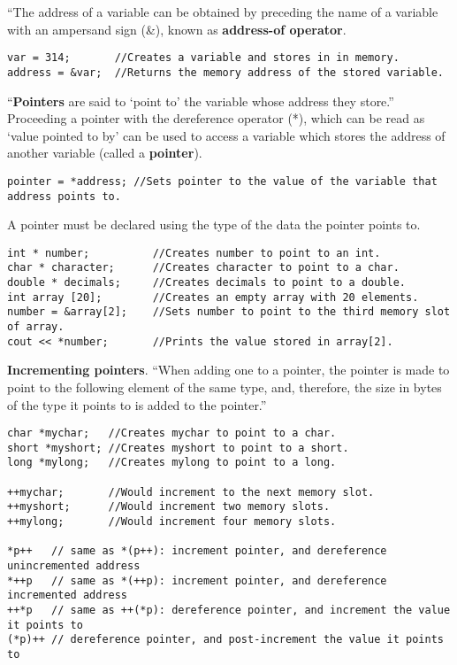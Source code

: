 ``The address of a variable can be obtained by preceding the name of a variable with an ampersand sign (\&), known as \textbf{address-of operator}. \cite{cpp:pointers}
\begin{lstlisting}
var = 314;       //Creates a variable and stores in in memory.
address = &var;  //Returns the memory address of the stored variable.
\end{lstlisting}

``\textbf{Pointers} are said to `point to' the variable whose address they store.'' \cite{cpp:pointers} Proceeding a pointer with the dereference operator (*), which can be read as `value pointed to by' can be used to access a variable which stores the address of another variable (called a \textbf{pointer}).
\begin{lstlisting}
pointer = *address; //Sets pointer to the value of the variable that address points to.
\end{lstlisting}

A pointer must be declared using the type of the data the pointer points to.
\begin{lstlisting}
int * number;          //Creates number to point to an int.
char * character;      //Creates character to point to a char.
double * decimals;     //Creates decimals to point to a double.
int array [20];        //Creates an empty array with 20 elements.
number = &array[2];    //Sets number to point to the third memory slot of array.
cout << *number;       //Prints the value stored in array[2].
\end{lstlisting}

\textbf{Incrementing pointers}. ``When adding one to a pointer, the pointer is made to point to the following element of the same type, and, therefore, the size in bytes of the type it points to is added to the pointer.''
\begin{lstlisting}
char *mychar;   //Creates mychar to point to a char.
short *myshort; //Creates myshort to point to a short.
long *mylong;   //Creates mylong to point to a long.

++mychar;       //Would increment to the next memory slot.
++myshort;      //Would increment two memory slots.
++mylong;       //Would increment four memory slots.

*p++   // same as *(p++): increment pointer, and dereference unincremented address
*++p   // same as *(++p): increment pointer, and dereference incremented address
++*p   // same as ++(*p): dereference pointer, and increment the value it points to
(*p)++ // dereference pointer, and post-increment the value it points to 
\end{lstlisting}

